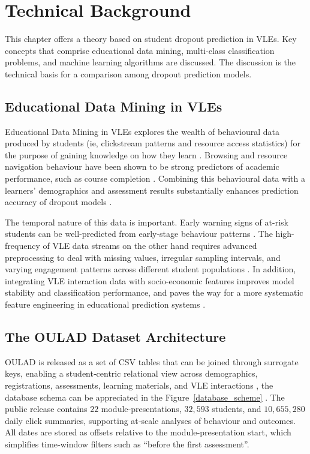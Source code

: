 \documentclass[ %
                    author={Carlos Duran Calle},
                supervisor={Dr. Felipe Campelo},
                    degree={MSc},
                     title={Comparative Machine Learning Analysis for Student Dropout Prediction in a Virtual Learning Environment},
                  subtitle={Incorporating Student Engagement and Socio-Economic Features},
                      type={},
                      year={2025}]{dissertation}
\begin{document}
\chapter{Technical Background}
\label{chap:background}

\vspace{1cm} 

\noindent
This chapter offers a theory based on student dropout prediction in VLEs. Key concepts that comprise educational data mining, multi-class classification problems, and machine learning algorithms are discussed. The discussion is the technical basis for a comparison among dropout prediction models.

\section{Educational Data Mining in VLEs}
Educational Data Mining in VLEs explores the wealth of behavioural data produced by students (ie, clickstream patterns and resource access statistics) for the purpose of gaining knowledge on how they learn \cite{romero_data_2013}. Browsing and resource navigation behaviour have been shown to be strong predictors of academic performance, such as course completion \cite{gasevic_learning_2016}. Combining this behavioural data with a learners' demographics and assessment results substantially enhances prediction accuracy of dropout models \cite{viberg_current_2018}.

The temporal nature of this data is important. Early warning signs of at-risk students can be well-predicted from early-stage behaviour patterns \cite{conijn_predicting_2017}. The high-frequency of VLE data streams on the other hand requires advanced preprocessing to deal with missing values, irregular sampling intervals, and varying engagement patterns across different student populations \cite{sclater_learning_2016}. In addition, integrating VLE interaction data with socio-economic features improves model stability and classification performance, and paves the way for a more systematic feature engineering in educational prediction systems \cite{hlosta_modellingVLE_2018}.

\section{The OULAD Dataset Architecture}
OULAD is released as a set of CSV tables that can be joined through surrogate keys, enabling a student‑centric relational view across demographics, registrations, assessments, learning materials, and VLE interactions \cite{kuzilek_OULAD_2017}, the database schema can be appreciated in the Figure~\ref{database_scheme} \cite{nafea_enhancing_2023}. The public release contains $22$ module‑presentations, $32,593$ students, and $10,655,280$ daily click summaries, supporting at‑scale analyses of behaviour and outcomes. All dates are stored as offsets relative to the module‑presentation start, which simplifies time‑window filters such as “before the first assessment”.
\end{document}
